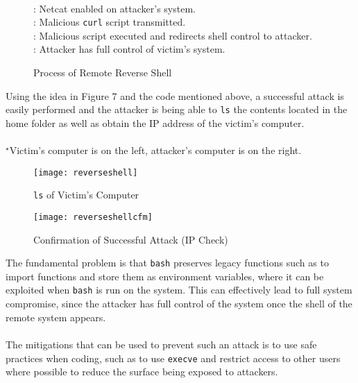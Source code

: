 \documentclass[a4paper,12pt]{article}
\newcommand*\circled[1]{\tikz[baseline=(char.base)]{
		\node[shape=circle,draw,inner sep=2pt] (char) {#1};}}
\begin{document}
\begin{figure}[H]
{	\centering
{}\\
}
\circled{1}: Netcat enabled on attacker's system.\\
\circled{2}: Malicious \texttt{curl} script transmitted.\\
\circled{3}: Malicious script executed and redirects shell control to attacker.\\
\circled{4}: Attacker has full control of victim's system.
\caption{Process of Remote Reverse Shell}
\end{figure}
\noindent Using the idea in Figure 7 and the code mentioned above, a successful attack is easily performed and the attacker is being able to \texttt{ls} the contents located in the home folder as well as obtain the IP address of the victim's computer.\\\\$^\star$Victim's computer is on the left, attacker's computer is on the right.
\begin{figure}[H]
	\centering
	\texttt{[image: reverseshell]}
	\caption{\texttt{ls} of Victim's Computer}
	\label{fig:reverseshell}
\end{figure}
\begin{figure}[H]
	\centering
	\texttt{[image: reverseshellcfm]}
	\caption{Confirmation of Successful Attack (IP Check)}
	\label{fig:reverseshellcfm}
\end{figure}
\noindent The fundamental problem is that \texttt{bash} preserves legacy functions such as to import functions and store them as environment variables, where it can be exploited when \texttt{bash} is run on the system. This can effectively lead to full system compromise, since the attacker has full control of the system once the shell of the remote system appears.\\\\The mitigations that can be used to prevent such an attack is to use safe practices when coding, such as to use \texttt{execve} and restrict access to other users where possible to reduce the surface being exposed to attackers.
\newpage
\end{document}
